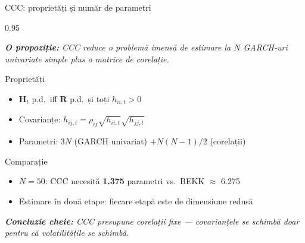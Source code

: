 \documentclass[9pt, aspectratio=169, t]{beamer}
\begin{document}
\begin{frame}{CCC: proprietăți și număr de parametri}
    \begin{cminipage}{0.95\textwidth}
    {\footnotesize
    \textit{\textbf{O propoziție:} CCC reduce o problemă imensă de estimare la $N$ GARCH-uri univariate simple plus o matrice de corelație.}
    \vspace{0.2cm}
    \begin{block}{Proprietăți}
        \begin{itemize}\setlength{\itemsep}{2pt}
            \item $\mathbf{H}_t$ p.d.\ iff $\mathbf{R}$ p.d.\ și toți $h_{ii,t} > 0$
            \item Covarianțe: $h_{ij,t} = \rho_{ij}\sqrt{h_{ii,t}}\sqrt{h_{jj,t}}$
            \item Parametri: $3N$ (GARCH univariat) $+ N(N-1)/2$ (corelații)
        \end{itemize}
    \end{block}
    \vspace{0.1cm}
    \begin{alertblock}{Comparație}
        \begin{itemize}\setlength{\itemsep}{0pt}
            \item $N = 50$: CCC necesită \textbf{1.375} parametri vs.\ BEKK $\approx$ 6.275
            \item Estimare în două etape: fiecare etapă este de dimensiune redusă
        \end{itemize}
    \end{alertblock}
    \vspace{0.2cm}
    \textit{\textbf{Concluzie cheie:} CCC presupune corelații fixe --- covarianțele se schimbă doar pentru că volatilitățile se schimbă.}
    }
    \end{cminipage}
\end{frame}
\end{document}
